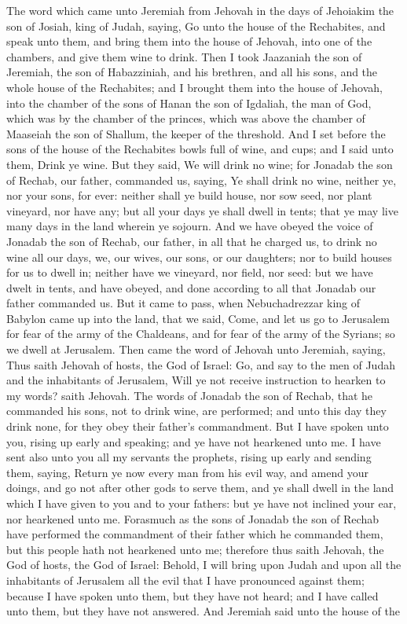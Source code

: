 The word which came unto Jeremiah from Jehovah in the days of Jehoiakim the son of Josiah, king of Judah, saying, Go unto the house of the Rechabites, and speak unto them, and bring them into the house of Jehovah, into one of the chambers, and give them wine to drink. Then I took Jaazaniah the son of Jeremiah, the son of Habazziniah, and his brethren, and all his sons, and the whole house of the Rechabites; and I brought them into the house of Jehovah, into the chamber of the sons of Hanan the son of Igdaliah, the man of God, which was by the chamber of the princes, which was above the chamber of Maaseiah the son of Shallum, the keeper of the threshold. And I set before the sons of the house of the Rechabites bowls full of wine, and cups; and I said unto them, Drink ye wine. But they said, We will drink no wine; for Jonadab the son of Rechab, our father, commanded us, saying, Ye shall drink no wine, neither ye, nor your sons, for ever: neither shall ye build house, nor sow seed, nor plant vineyard, nor have any; but all your days ye shall dwell in tents; that ye may live many days in the land wherein ye sojourn. And we have obeyed the voice of Jonadab the son of Rechab, our father, in all that he charged us, to drink no wine all our days, we, our wives, our sons, or our daughters; nor to build houses for us to dwell in; neither have we vineyard, nor field, nor seed: but we have dwelt in tents, and have obeyed, and done according to all that Jonadab our father commanded us. But it came to pass, when Nebuchadrezzar king of Babylon came up into the land, that we said, Come, and let us go to Jerusalem for fear of the army of the Chaldeans, and for fear of the army of the Syrians; so we dwell at Jerusalem.  Then came the word of Jehovah unto Jeremiah, saying, Thus saith Jehovah of hosts, the God of Israel: Go, and say to the men of Judah and the inhabitants of Jerusalem, Will ye not receive instruction to hearken to my words? saith Jehovah. The words of Jonadab the son of Rechab, that he commanded his sons, not to drink wine, are performed; and unto this day they drink none, for they obey their father’s commandment. But I have spoken unto you, rising up early and speaking; and ye have not hearkened unto me. I have sent also unto you all my servants the prophets, rising up early and sending them, saying, Return ye now every man from his evil way, and amend your doings, and go not after other gods to serve them, and ye shall dwell in the land which I have given to you and to your fathers: but ye have not inclined your ear, nor hearkened unto me. Forasmuch as the sons of Jonadab the son of Rechab have performed the commandment of their father which he commanded them, but this people hath not hearkened unto me; therefore thus saith Jehovah, the God of hosts, the God of Israel: Behold, I will bring upon Judah and upon all the inhabitants of Jerusalem all the evil that I have pronounced against them; because I have spoken unto them, but they have not heard; and I have called unto them, but they have not answered.  And Jeremiah said unto the house of the 